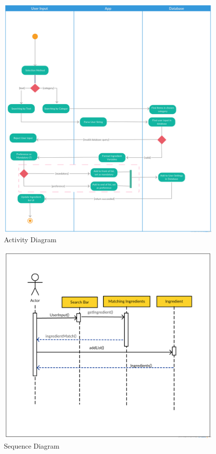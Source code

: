 \documentclass[12pt]{article}
\begin{document}
\begin{figure}
  \includegraphics[width=\linewidth]{activity.png}
  \caption{Activity Diagram}
  \label{fig:activity}
\end{figure}

\newpage
\begin{figure}
    \includegraphics[width=\linewidth]{sequence.png}
    \caption{Sequence Diagram}
    \label{fig:sequence}
\end{figure}
\end{document}
